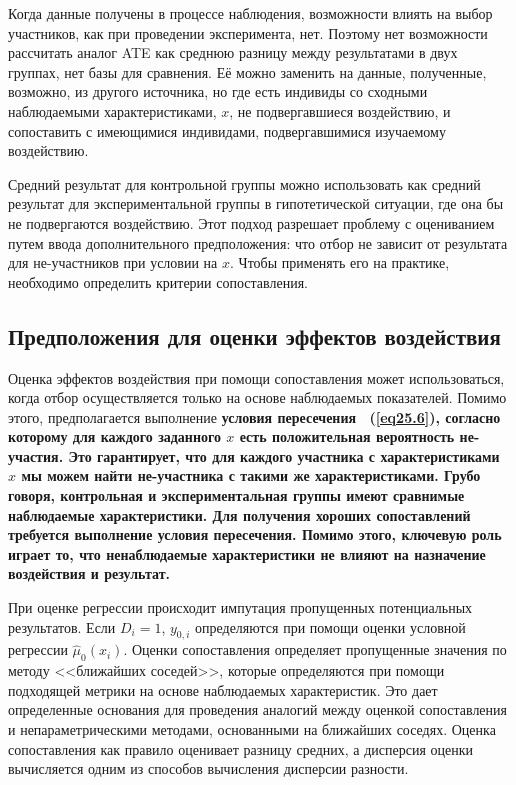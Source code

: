 Когда данные получены в процессе наблюдения, возможности влиять на выбор участников, как при проведении эксперимента, нет. Поэтому нет возможности рассчитать аналог ATE как среднюю разницу между результатами в двух группах, нет базы для сравнения. Её можно заменить на данные, полученные, возможно, из другого источника, но где есть индивиды со сходными наблюдаемыми характеристиками, $x$, не подвергавшиеся воздействию, и сопоставить с имеющимися индивидами, подвергавшимися изучаемому воздействию. 

Средний результат для контрольной группы можно использовать как средний результат для экспериментальной группы в гипотетической ситуации, где она бы не подвергаются воздействию. Этот подход разрешает проблему с оцениванием путем ввода дополнительного предположения: что отбор не зависит от результата для не-участников при условии на $x$. Чтобы применять его на практике, необходимо определить критерии сопоставления. 

\subsection{Предположения для оценки эффектов воздействия}

Оценка эффектов воздействия при помощи сопоставления может использоваться, когда отбор осуществляется только на основе наблюдаемых показателей. Помимо этого, предполагается выполнение \bfseries условия пересечения \mdseries ~(\ref{eq25.6}), согласно которому для каждого заданного $x$ есть положительная вероятность не-участия. Это гарантирует, что для каждого участника с характеристиками $x$ мы можем найти не-участника с такими же характеристиками. Грубо говоря, контрольная и экспериментальная группы имеют сравнимые наблюдаемые характеристики. Для получения хороших сопоставлений требуется выполнение условия пересечения. Помимо этого, ключевую роль играет то, что ненаблюдаемые характеристики не влияют на назначение воздействия и результат. 

При оценке регрессии происходит импутация пропущенных потенциальных результатов. Если $D_i = 1$, $y_{0,i}$ определяются при помощи оценки условной регрессии $\hat \mu_0 (x_i)$. Оценки сопоставления определяет пропущенные значения по методу <<ближайших соседей>>, которые определяются при помощи подходящей метрики на основе наблюдаемых характеристик. Это дает определенные основания для проведения аналогий между оценкой сопоставления и непараметрическими методами, основанными на ближайших соседях. Оценка сопоставления как правило оценивает разницу средних, а дисперсия оценки вычисляется одним из способов вычисления дисперсии разности. 


